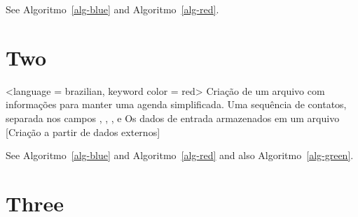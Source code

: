 \documentclass[
  letterpaper,
]{scrbook}
\begin{document}
See Algoritmo~\ref{alg-blue} and Algoritmo~\ref{alg-red}.


\chapter{Two}\label{two}

\begin{algorithm}[H]
\caption{\label{alg-red}}
\begingroup%

\begin{algorithmic}<language = brazilian, keyword color = red>
    \Description Criação de um arquivo com informações para manter uma agenda simplificada.
    \Input Uma sequência de contatos, separada nos campos , , ,  e 
    \Output Os dados de entrada armazenados em um arquivo
    [Criação a partir de dados externos]
          \Statex
      \EndWhile
    \EndProcedure
\end{algorithmic}

\endgroup
\end{algorithm}

See Algoritmo~\ref{alg-blue} and Algoritmo~\ref{alg-red} and also
Algoritmo~\ref{alg-green}.


\chapter{Three}\label{three}
\end{document}
